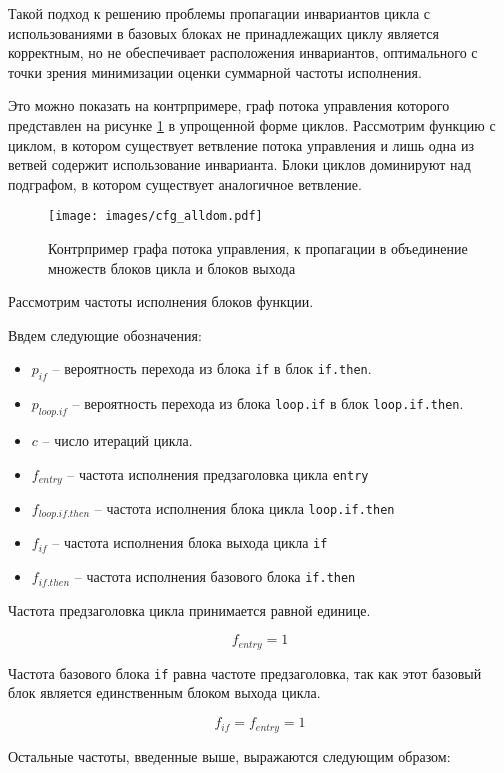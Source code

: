 Такой подход к решению проблемы пропагации инвариантов цикла с использованиями в базовых блоках не принадлежащих циклу является корректным, но не обеспечивает расположения инвариантов, оптимального с точки зрения минимизации оценки суммарной частоты исполнения.

Это можно показать на контрпримере, граф потока управления которого представлен на рисунке \ref{fig:cfg_alldom} в упрощенной форме циклов.
Рассмотрим функцию с циклом, в котором существует ветвление потока управления и лишь одна из ветвей содержит использование инварианта.
Блоки циклов доминируют над подграфом, в котором существует аналогичное ветвление.

\begin{figure}
    \centering
    \texttt{[image: images/cfg\_alldom.pdf]}
    \caption{Контрпример графа потока управления, к пропагации в объединение множеств блоков цикла и блоков выхода}
    \label{fig:cfg_alldom}
\end{figure}

Рассмотрим частоты исполнения блоков функции.

Ввдем следующие обозначения:
\begin{itemize}
    \item $p_{if}$ -- вероятность перехода из блока \texttt{if} в блок \texttt{if.then}.
    \item $p_{loop.if}$ -- вероятность перехода из блока \texttt{loop.if} в блок \texttt{loop.if.then}.
    \item $c$ -- число итераций цикла.
    \item $f_{entry}$ -- частота исполнения предзаголовка цикла \texttt{entry}
    \item $f_{loop.if.then}$ -- частота исполнения блока цикла \texttt{loop.if.then}
    \item $f_{if}$ -- частота исполнения блока выхода цикла \texttt{if}
    \item $f_{if.then}$ -- частота исполнения базового блока \texttt{if.then}
\end{itemize}

Частота предзаголовка цикла принимается равной единице.

$$ f_{entry} = 1 $$

Частота базового блока \texttt{if} равна частоте предзаголовка, так как этот базовый блок является единственным блоком выхода цикла.

$$ f_{if} = f_{entry} = 1 $$

Остальные частоты, введенные выше, выражаются следующим образом:


